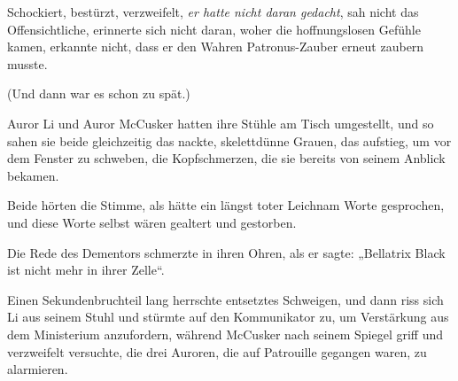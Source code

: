 Schockiert, bestürzt, verzweifelt, \emph{er hatte nicht daran gedacht}, sah nicht das Offensichtliche, erinnerte sich nicht daran, woher die hoffnungslosen Gefühle kamen, erkannte nicht, dass er den Wahren Patronus-Zauber erneut zaubern musste.

(Und dann war es schon zu spät.)

\later

Auror Li und Auror McCusker hatten ihre Stühle am Tisch umgestellt, und so sahen sie beide gleichzeitig das nackte, skelettdünne Grauen, das aufstieg, um vor dem Fenster zu schweben, die Kopfschmerzen, die sie bereits von seinem Anblick bekamen.

Beide hörten die Stimme, als hätte ein längst toter Leichnam Worte gesprochen, und diese Worte selbst wären gealtert und gestorben.

Die Rede des Dementors schmerzte in ihren Ohren, als er sagte: „Bellatrix Black ist nicht mehr in ihrer Zelle“.

Einen Sekundenbruchteil lang herrschte entsetztes Schweigen, und dann riss sich Li aus seinem Stuhl und stürmte auf den Kommunikator zu, um Verstärkung aus dem Ministerium anzufordern, während McCusker nach seinem Spiegel griff und verzweifelt versuchte, die drei Auroren, die auf Patrouille gegangen waren, zu alarmieren.


